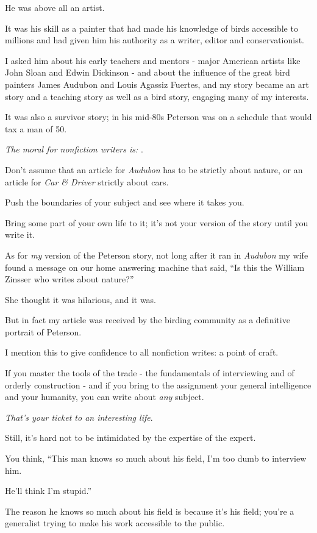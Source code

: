 \documentclass{book}
\numberwithin{equation}{section}
\begin{document}
He was above all an artist.

It was his skill as a painter that had made his knowledge of birds accessible to millions and had given him his authority as a writer, editor and conservationist.

I asked him about his early teachers and mentors - major American artists like John Sloan and Edwin Dickinson - and about the influence of the great bird painters James Audubon and Louis Agassiz Fuertes, and my story became an art story and a teaching story as well as a bird story, engaging many of my interests.

It was also a survivor story; in his mid-80s Peterson was on a schedule that would tax a man of 50.

%
\textit{The moral for nonfiction writers is: }.

Don't assume that an article for \textit{Audubon} has to be strictly about nature, or an article for \textit{Car \& Driver} strictly about cars.

Push the boundaries of your subject and see where it takes you.

Bring some part of your own life to it; it's not your version of the story until you write it.

%
As for \textit{my} version of the Peterson story, not long after it ran in \textit{Audubon} my wife found a message on our home answering machine that said, ``Is this the William Zinsser who writes about nature?''

She thought it was hilarious, and it was.

But in fact my article was received by the birding community as a definitive portrait of Peterson.

I mention this to give confidence to all nonfiction writes: a point of craft.

If you master the tools of the trade - the fundamentals of interviewing and of orderly construction - and if you bring to the assignment your general intelligence and your humanity, you can write about \textit{any} subject.

\textit{That's your ticket to an interesting life}.

%
Still, it's hard not to be intimidated by the expertise of the expert.

You think, ``This man knows so much about his field, I'm too dumb to interview him.

He'll think I'm stupid.''

The reason he knows so much about his field is because it's his field; you're a generalist trying to make his work accessible to the public.
\end{document}
